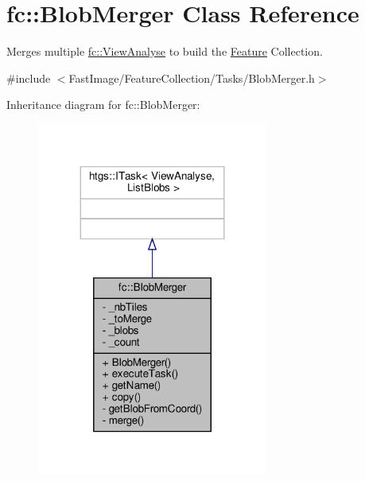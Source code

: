 \hypertarget{classfc_1_1BlobMerger}{}\section{fc\+:\+:Blob\+Merger Class Reference}
\label{classfc_1_1BlobMerger}


Merges multiple \hyperlink{classfc_1_1ViewAnalyse}{fc\+::\+View\+Analyse} to build the \hyperlink{classfc_1_1Feature}{Feature} Collection.  




{\ttfamily \#include $<$Fast\+Image/\+Feature\+Collection/\+Tasks/\+Blob\+Merger.\+h$>$}



Inheritance diagram for fc\+:\+:Blob\+Merger\+:
\nopagebreak
\begin{figure}[H]
\begin{center}
\leavevmode
\includegraphics[width=215pt]{d1/d9d/classfc_1_1BlobMerger__inherit__graph}
\end{center}
\end{figure}


